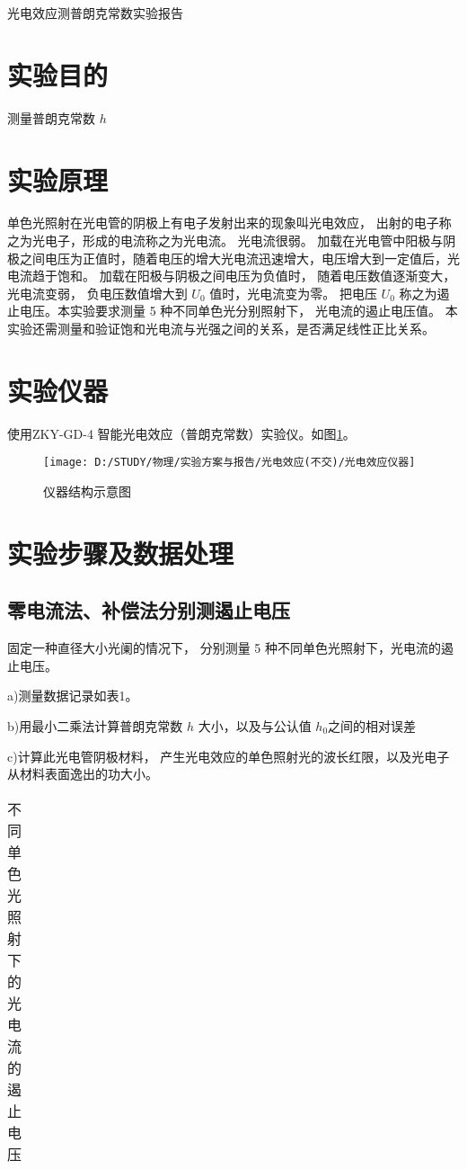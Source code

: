 \documentclass[11pt]{article}
\begin{document}
	\begin{center}
		\Large \heiti 光电效应测普朗克常数实验报告
	\end{center}
\section{实验目的}
测量普朗克常数 $ h $
\section{实验原理}
单色光照射在光电管的阴极上有电子发射出来的现象叫光电效应， 出射的电子称之为光电子，形成的电流称之为光电流。 光电流很弱。 加载在光电管中阳极与阴极之间电压为正值时，随着电压的增大光电流迅速增大，电压增大到一定值后，光电流趋于饱和。 加载在阳极与阴极之间电压为负值时， 随着电压数值逐渐变大，光电流变弱， 负电压数值增大到 $ U_0 $ 值时，光电流变为零。 把电压 $ U_0 $ 称之为遏止电压。本实验要求测量 5 种不同单色光分别照射下， 光电流的遏止电压值。 本实验还需测量和验证饱和光电流与光强之间的关系，是否满足线性正比关系。
\section{实验仪器}
使用ZKY-GD-4 智能光电效应（普朗克常数）实验仪。如图\ref{fig:1}。
\begin{figure}[htbp]
	\centering
	\texttt{[image: D:/STUDY/物理/实验方案与报告/光电效应(不交)/光电效应仪器]}
	\caption{仪器结构示意图}
	\label{fig:1}
\end{figure}
\section{实验步骤及数据处理}
\subsection{零电流法、补偿法分别测遏止电压}
固定一种直径大小光阑的情况下， 分别测量 5 种不同单色光照射下，光电流的遏止电压。

\kaishu a)测量数据记录如表1。

b)用最小二乘法计算普朗克常数 $ h $ 大小，以及与公认值 $ h_0 $之间的相对误差

c)计算此光电管阴极材料， 产生光电效应的单色照射光的波长红限，以及光电子从材料表面逸出的功大小。\songti
\begin{table}[htbp]\small
	\caption{不同单色光照射下的光电流的遏止电压}
	\centering
	\begin{tabular}{cccccc}
	\end{tabular}
\end{table}
\end{document}
